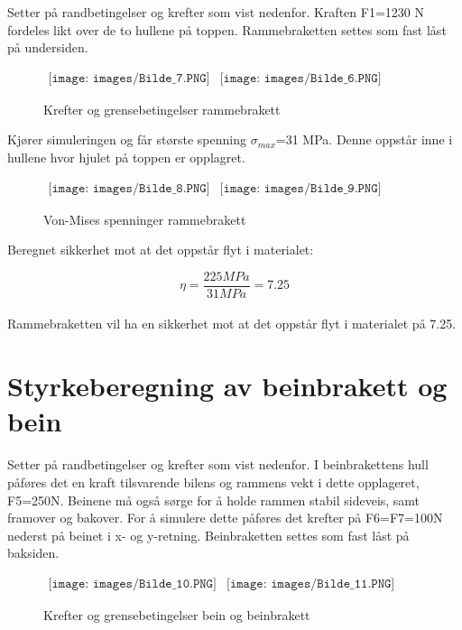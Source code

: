 Setter på randbetingelser og krefter som vist nedenfor. Kraften F1=1230 N fordeles likt over de to hullene på toppen. Rammebraketten settes som fast låst på undersiden.

\begin{figure}[H]
\begin{center}$
\begin{array}{ccc}
\texttt{[image: images/Bilde\_7.PNG]} &
\texttt{[image: images/Bilde\_6.PNG]} &  
\end{array}$
\end{center}
\caption{Krefter og grensebetingelser rammebrakett}
\end{figure}

Kjører simuleringen og får største spenning $\sigma_{max}$=31 MPa. Denne oppstår inne i hullene hvor hjulet på toppen er opplagret.

\begin{figure}[H]
\begin{center}$
\begin{array}{ccc}
\texttt{[image: images/Bilde\_8.PNG]} &
\texttt{[image: images/Bilde\_9.PNG]} &  
\end{array}$
\end{center}
\caption{Von-Mises spenninger rammebrakett}
\end{figure}

Beregnet sikkerhet mot at det oppstår flyt i materialet:

\begin{equation}
\eta=\frac{225 MPa}{31 MPa}=7.25
\end{equation}\\

Rammebraketten vil ha en sikkerhet mot at det oppstår flyt i materialet på 7.25.\newpage

\section{Styrkeberegning av beinbrakett og bein}
Setter på randbetingelser og krefter som vist nedenfor. I beinbrakettens hull påføres det en kraft tilsvarende bilens og rammens vekt i dette opplageret, F5=250N. Beinene må også sørge for å holde rammen stabil sideveis, samt framover og bakover. For å simulere dette påføres det krefter på F6=F7=100N nederst på beinet i x- og y-retning. Beinbraketten settes som fast låst på baksiden.

\begin{figure}[H]
\begin{center}$
\begin{array}{ccc}
\texttt{[image: images/Bilde\_10.PNG]} &
\texttt{[image: images/Bilde\_11.PNG]} &  
\end{array}$
\end{center}
\caption{Krefter og grensebetingelser bein og beinbrakett}
\end{figure}

